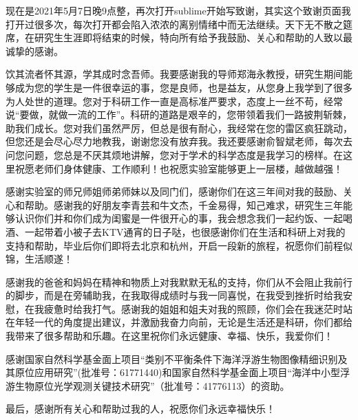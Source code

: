 \begin{acknowledgement}
  现在是2021年5月7日晚9点整，再次打开sublime开始写致谢，其实这个致谢页面我打开过很多次，每次打开都会陷入浓浓的离别情绪中而无法继续。天下无不散之筵席，在研究生生涯即将结束的时候，特向所有给予我鼓励、关心和帮助的人致以最诚挚的感谢。

  饮其流者怀其源，学其成时念吾师。我要感谢我的导师郑海永教授，研究生期间能够成为您的学生是一件很幸运的事，您是良师，也是益友，从您身上我学到了很多为人处世的道理。您对于科研工作一直是高标准严要求，态度上一丝不苟，经常说“要做，就做一流的工作”。科研的道路是艰辛的，您带领着我们一路披荆斩棘，助我们成长。您对我们虽然严厉，但总是很有耐心，我经常在您的雷区疯狂跳动，但您还是会尽心尽力地教我，谢谢您没有放弃我。我还要感谢俞智斌老师，每次去问您问题，您总是不厌其烦地讲解，您对于学术的科学态度是我学习的榜样。在这里祝愿老师们身体健康、工作顺利！也祝愿实验室能够更上一层楼，越做越强！

  感谢实验室的师兄师姐师弟师妹以及同门们，感谢你们在这三年间对我的鼓励、关心和帮助。感谢我的好朋友李青芸和牛文杰，千金易得，知己难求，研究生三年能够认识你们并和你们成为闺蜜是一件很开心的事，我会想念我们一起约饭、一起喝酒、一起带着小被子去KTV通宵的日子哒，也很感谢你们在生活和科研上对我的支持和帮助，毕业后你们即将去北京和杭州，开启一段新的旅程，祝愿你们前程似锦，生活顺遂！

  感谢我的爸爸和妈妈在精神和物质上对我默默无私的支持，你们从不会阻止我前行的脚步，而是在旁辅助我，在我取得成绩时与我一同喜悦，在我受到挫折时给我安慰，在我疲惫时给我打气。感谢我的姐姐和姐夫对我的照顾，你们会在我迷茫时站在年轻一代的角度提出建议，并激励我奋力向前，无论是生活还是科研，你们都给我带来了很多帮助和乐趣。在这里祝你们永远健康、幸福、快乐，我爱你们！

  感谢国家自然科学基金面上项目“类别不平衡条件下海洋浮游生物图像精细识别及其原位应用研究”(批准号：61771440)和国家自然科学基金面上项目“海洋中小型浮游生物原位光学观测关键技术研究”（批准号：41776113）的资助。

  最后，感谢所有关心和帮助过我的人，祝愿你们永远幸福快乐！

\end{acknowledgement}
